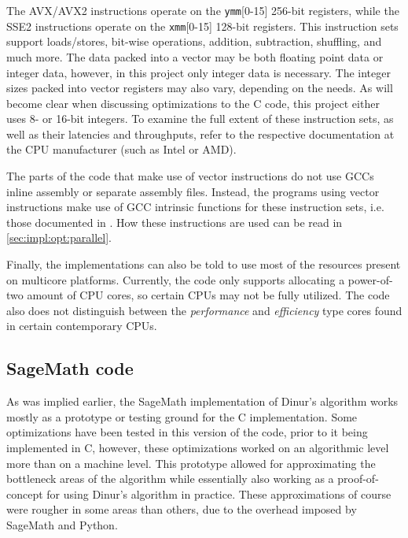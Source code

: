 The AVX/AVX2 instructions operate on the \texttt{ymm}[0-15] 256-bit registers, while the SSE2 instructions operate on the \texttt{xmm}[0-15] 128-bit registers. This instruction sets support loads/stores, bit-wise operations, addition, subtraction, shuffling, and much more. The data packed into a vector may be both floating point data or integer data, however, in this project only integer data is necessary. The integer sizes packed into vector registers may also vary, depending on the needs. As will become clear when discussing optimizations to the C code, this project either uses 8- or 16-bit integers. To examine the full extent of these instruction sets, as well as their latencies and throughputs, refer to the respective documentation at the CPU manufacturer (such as Intel or AMD).

The parts of the code that make use of vector instructions do not use GCCs inline assembly or separate assembly files. Instead, the programs using vector instructions make use of GCC intrinsic functions for these instruction sets, i.e. those documented in \cite{IntelIntr}. How these instructions are used can be read in \cref{sec:impl:opt:parallel}.

Finally, the implementations can also be told to use most of the resources present on multicore platforms. Currently, the code only supports allocating a power-of-two amount of CPU cores, so certain CPUs may not be fully utilized. The code also does not distinguish between the \textit{performance} and \textit{efficiency} type cores found in certain contemporary CPUs.

\subsection{SageMath code} \label{sec:impl:sage}
As was implied earlier, the SageMath implementation of Dinur's algorithm works mostly as a prototype or testing ground for the C implementation. Some optimizations have been tested in this version of the code, prior to it being implemented in C, however, these optimizations worked on an algorithmic level more than on a machine level.  This prototype allowed for approximating the bottleneck areas of the algorithm while essentially also working as a proof-of-concept for using Dinur's algorithm in practice. These approximations of course were rougher in some areas than others, due to the overhead imposed by SageMath and Python.

